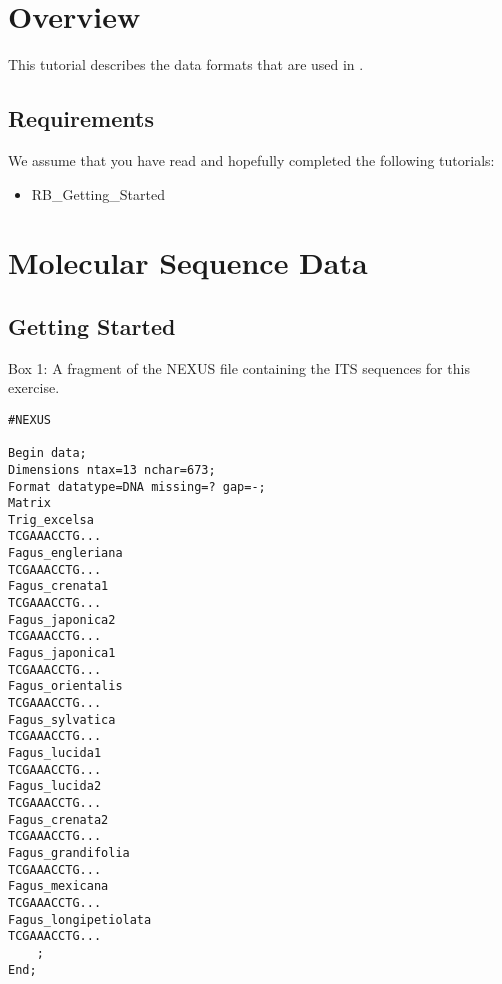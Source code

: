 \section{Overview}


This tutorial describes the data formats that are used in \RevBayes.


\subsection*{Requirements}
We assume that you have read and hopefully completed the following tutorials:
\begin{itemize}
\item RB\_Getting\_Started
\end{itemize}



%
%
%
\newpage
\FloatBarrier
\section{Molecular Sequence Data}

\bigskip
\subsection{Getting Started}




\begin{center}
Box 1: A fragment of the NEXUS file containing the ITS sequences for this exercise. \\
\end{center}
{\tt \scriptsize \begin{framed}
\begin{lstlisting}
#NEXUS 

Begin data;
Dimensions ntax=13 nchar=673;
Format datatype=DNA missing=? gap=-;
Matrix
Trig_excelsa   
TCGAAACCTG...
Fagus_engleriana   
TCGAAACCTG...
Fagus_crenata1   
TCGAAACCTG...
Fagus_japonica2   
TCGAAACCTG...
Fagus_japonica1   
TCGAAACCTG...
Fagus_orientalis   
TCGAAACCTG...
Fagus_sylvatica   
TCGAAACCTG...
Fagus_lucida1   
TCGAAACCTG...
Fagus_lucida2   
TCGAAACCTG...
Fagus_crenata2   
TCGAAACCTG...
Fagus_grandifolia   
TCGAAACCTG...
Fagus_mexicana   
TCGAAACCTG...
Fagus_longipetiolata   
TCGAAACCTG...
	;
End;
\end{lstlisting}
\end{framed}}



